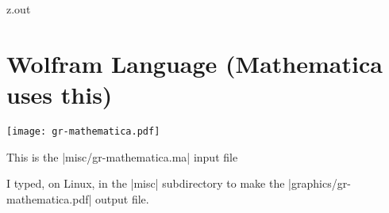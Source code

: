\MyIO


\begin{VerbatimOut}{z.out}

\section{Wolfram Language (Mathematica uses this)}


\texttt{[image: gr-mathematica.pdf]}

This is the |misc/gr-mathematica.ma| input file

I typed, on Linux,
in the |misc| subdirectory
to make the |graphics/gr-mathematica.pdf| output file.
\end{VerbatimOut}

\MyIO
